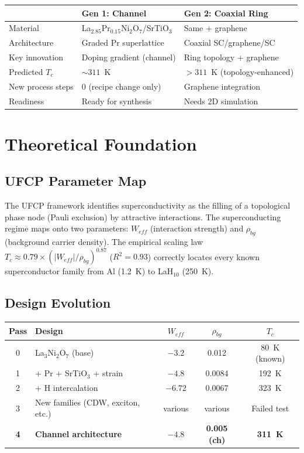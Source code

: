 \documentclass[11pt, a4paper]{article}
\begin{document}
\begin{center}
\begin{tabular}{@{}lll@{}}
\toprule
& \textbf{Gen 1: Channel} & \textbf{Gen 2: Coaxial Ring} \\
\midrule
Material & La$_{2.85}$Pr$_{0.15}$Ni$_2$O$_7$/SrTiO$_3$ & Same + graphene \\
Architecture & Graded Pr superlattice & Coaxial SC/graphene/SC \\
Key innovation & Doping gradient (channel) & Ring topology + graphene \\
Predicted $T_c$ & $\sim 311$~K & $> 311$~K (topology-enhanced) \\
New process steps & 0 (recipe change only) & Graphene integration \\
Readiness & \textcolor{nm-green}{Ready for synthesis} &
  \textcolor{nm-red}{Needs 2D simulation} \\
\bottomrule
\end{tabular}
\end{center}

\tableofcontents

\section{Theoretical Foundation}

\subsection{UFCP Parameter Map}

The UFCP framework identifies superconductivity as the filling of
a topological phase node (Pauli exclusion) by attractive
interactions. The superconducting regime maps onto two parameters:
$W_{eff}$ (interaction strength) and $\rho_{bg}$ (background
carrier density). The empirical scaling law
$T_c \approx 0.79 \times (|W_{eff}|/\rho_{bg})^{0.87}$ ($R^2 = 0.93$)
correctly locates every known superconductor family from Al (1.2~K)
to LaH$_{10}$ (250~K).

\subsection{Design Evolution}

\begin{center}
\begin{tabular}{@{}clccc@{}}
\toprule
\textbf{Pass} & \textbf{Design} & $W_{eff}$ & $\rho_{bg}$ & $T_c$ \\
\midrule
0 & La$_3$Ni$_2$O$_7$ (base) & $-3.2$ & 0.012 & 80~K (known) \\
1 & + Pr + SrTiO$_3$ + strain & $-4.8$ & 0.0084 & 192~K \\
2 & + H intercalation & $-6.72$ & 0.0067 & 323~K \\
3 & New families (CDW, exciton, etc.) & various & various & Failed test \\
\textbf{4} & \textbf{Channel architecture} & $\mathbf{-4.8}$ &
  \textbf{0.005 (ch)} & \textbf{311~K} \\
\bottomrule
\end{tabular}
\end{center}
\end{document}
